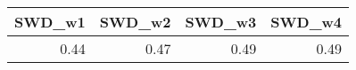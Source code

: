 
\begin{tabular}{r|r|r|r}
\hline
SWD\_w1 & SWD\_w2 & SWD\_w3 & SWD\_w4\\
\hline
0.44 & 0.47 & 0.49 & 0.49\\
\hline
\end{tabular}
